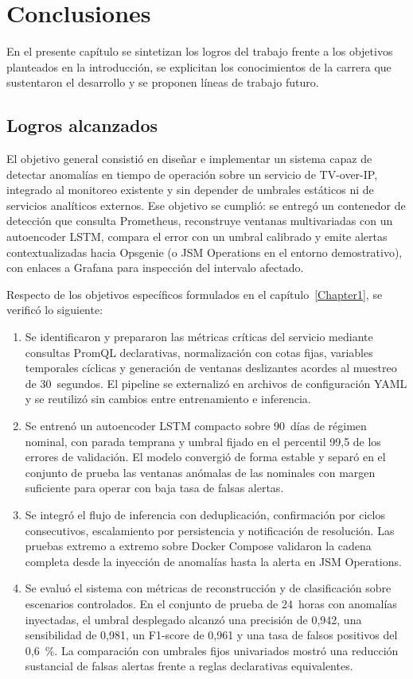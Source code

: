 
\chapter{Conclusiones}
\label{Chapter5}

En el presente capítulo se sintetizan los logros del trabajo frente a los objetivos planteados en la introducción, se explicitan los conocimientos de la carrera que sustentaron el desarrollo y se proponen líneas de trabajo futuro.

\section{Logros alcanzados}

El objetivo general consistió en diseñar e implementar un sistema capaz de detectar anomalías en tiempo de operación sobre un servicio de TV-over-IP, integrado al monitoreo existente y sin depender de umbrales estáticos ni de servicios analíticos externos. Ese objetivo se cumplió: se entregó un contenedor de detección que consulta Prometheus, reconstruye ventanas multivariadas con un autoencoder LSTM, compara el error con un umbral calibrado y emite alertas contextualizadas hacia Opsgenie (o JSM Operations en el entorno demostrativo), con enlaces a Grafana para inspección del intervalo afectado.

Respecto de los objetivos específicos formulados en el capítulo~\ref{Chapter1}, se verificó lo siguiente:

\begin{enumerate}
\item Se identificaron y prepararon las métricas críticas del servicio mediante consultas PromQL declarativas, normalización con cotas fijas, variables temporales cíclicas y generación de ventanas deslizantes acordes al muestreo de 30~segundos. El pipeline se externalizó en archivos de configuración YAML y se reutilizó sin cambios entre entrenamiento e inferencia.
\item Se entrenó un autoencoder LSTM compacto sobre 90~días de régimen nominal, con parada temprana y umbral fijado en el percentil 99,5 de los errores de validación. El modelo convergió de forma estable y separó en el conjunto de prueba las ventanas anómalas de las nominales con margen suficiente para operar con baja tasa de falsas alertas.
\item Se integró el flujo de inferencia con deduplicación, confirmación por ciclos consecutivos, escalamiento por persistencia y notificación de resolución. Las pruebas extremo a extremo sobre Docker Compose validaron la cadena completa desde la inyección de anomalías hasta la alerta en JSM Operations.
\item Se evaluó el sistema con métricas de reconstrucción y de clasificación sobre escenarios controlados. En el conjunto de prueba de 24~horas con anomalías inyectadas, el umbral desplegado alcanzó una precisión de 0,942, una sensibilidad de 0,981, un F1-score de 0,961 y una tasa de falsos positivos del 0,6~\%. La comparación con umbrales fijos univariados mostró una reducción sustancial de falsas alertas frente a reglas declarativas equivalentes.
\end{enumerate}

